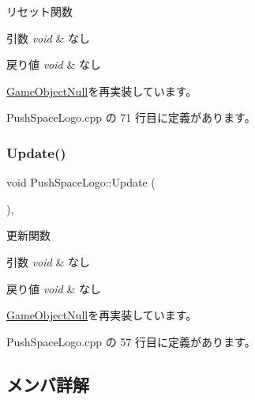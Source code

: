 リセット関数 


\begin{DoxyParams}{引数}
{\em void} & なし \\
\hline
\end{DoxyParams}

\begin{DoxyRetVals}{戻り値}
{\em void} & なし \\
\hline
\end{DoxyRetVals}


\mbox{\hyperlink{class_game_object_null_a26a748e17ea31b987249022562f5198c}{Game\+Object\+Null}}を再実装しています。



 Push\+Space\+Logo.\+cpp の 71 行目に定義があります。

\mbox{\label{class_push_space_logo_a2f81cf35e02096bf309146c0bce0b44d}} 
\subsubsection{\texorpdfstring{Update()}{Update()}}
{\footnotesize\ttfamily void Push\+Space\+Logo\+::\+Update (\begin{DoxyParamCaption}{ }\end{DoxyParamCaption})\hspace{0.3cm}{\ttfamily [override]}, {\ttfamily [virtual]}}



更新関数 


\begin{DoxyParams}{引数}
{\em void} & なし \\
\hline
\end{DoxyParams}

\begin{DoxyRetVals}{戻り値}
{\em void} & なし \\
\hline
\end{DoxyRetVals}


\mbox{\hyperlink{class_game_object_null_aeeb51b7e7aa41fd0b16f8f7c016bdb55}{Game\+Object\+Null}}を再実装しています。



 Push\+Space\+Logo.\+cpp の 57 行目に定義があります。



\subsection{メンバ詳解}
\mbox{\label{class_push_space_logo_af5bbec0fee0b7370a4b24763b40c19b0}} 

